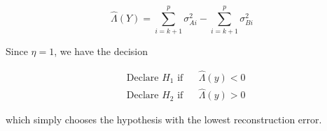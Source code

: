 \documentclass[english]{article}
\begin{document}
\begin{equation}\label{eq:gauss LRT3}
\hat{\Lambda}(Y) = \sum_{i=k+1}^p\sigma^2_{Ai} - \sum_{i=k+1}^p\sigma^2_{Bi}
\end{equation}

Since $\eta=1$, we have the decision

\begin{equation}
\begin{aligned}
&\text{Declare } H_1 \text{ if}
&& \hat{\Lambda}(y) < 0\\
& \text{Declare } H_2 \text{ if}
&& \hat{\Lambda}(y) > 0
\end{aligned}
\end{equation}

which simply chooses the hypothesis with the lowest reconstruction error.
\end{document}
